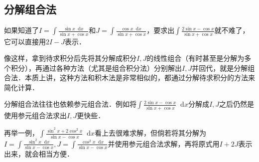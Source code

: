 \documentclass{ctexbook}
\newcommand*{\dif}{\mathop{}\!\mathrm{d}}
\begin{document}
\subsection{分解组合法}
如果知道了$I=\int\frac{\sin{x}\dif{x}}{\sin{x}+\cos{x}}$和$J=\int\frac{\cos{x}\dif{x}}{\sin{x}+\cos{x}}$，要求出$\int\frac{2\sin{x}-\cos{x}}{\sin{x}+\cos{x}}$就不难了，它可以直接用$2I-J$表示．\par
像这样，拿到待求积分后先将其分解成积分$I,J$的线性组合（有时甚至是分解为多个积分），再通过各种方法（尤其是组合积分法）分别解出$I,J$并回代，就是分解组合法．本质上讲，这种方法和积木法是非常相似的，都通过分解待求积分的方法来简化计算．\par
分解组合法往往也依赖参元组合法．例如将$\int\frac{2\sin{x}-\cos{x}}{\sin{x}+\cos{x}}\dif{x}$分解成$I,J$之后仍然是使用参元组合法求出$I,J$更快些．\par
再举一例，$\int\frac{\sin^{2}{x}+2\cos^{2}{x}}{\sin{x}-\cos{x}}\dif{x}$看上去很难求解，但倘若将其分解为$I=\int\frac{\sin^{2}{x}\dif{x}}{\sin{x}-\cos{x}},J=\int\frac{\cos^{2}{x}\dif{x}}{\sin{x}-\cos{x}}$并使用参元组合法求解，再将原式用$I+2J$表示出来，就会相当方便．\par
\end{document}
